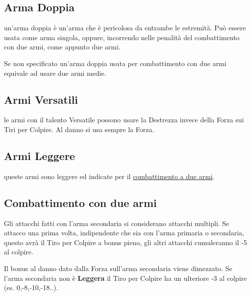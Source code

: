 \begin{multicols}{2}
\subsection{Arma Doppia} \label{armadippia}

un'arma doppia è un'arma che è pericolosa da entrambe le estremità. Può essere usata come arma singola, oppure, incorrendo nelle penalità del combattimento con due armi, come appunto due armi.

Se non specificato un'arma doppia usata per combattimento con due armi equivale ad usare due armi medie.

\subsection{Armi Versatili} \label{armiversatili}

le armi con il talento Versatile possono usare la Destrezza invece della Forza sui Tiri per Colpire. Al danno si usa sempre la Forza.

\subsection{Armi Leggere} \label{armileggere}

queste armi sono leggere ed indicate per il \hyperlink{combattimentoaduemani}{combattimento a due armi}.



\subsection{Combattimento con due armi}\hypertarget{combattimentoaduemani}{}\label{combattimentoduemani}

Gli attacchi fatti con l'arma secondaria si considerano attacchi multipli.
Se attacco una prima volta, indipendente che sia con l'arma primaria o secondaria, questo avrà il Tiro per Colpire a bonus pieno, gli altri attacchi cumuleranno il -5 al colpire.

Il bonus al danno dato dalla Forza sull'arma secondaria viene dimezzato. Se l'arma secondaria non è \textbf{Leggera} il Tiro per Colpire ha un ulteriore -3 al colpire (es. 0,-8,-10,-18..).


\end{multicols}

